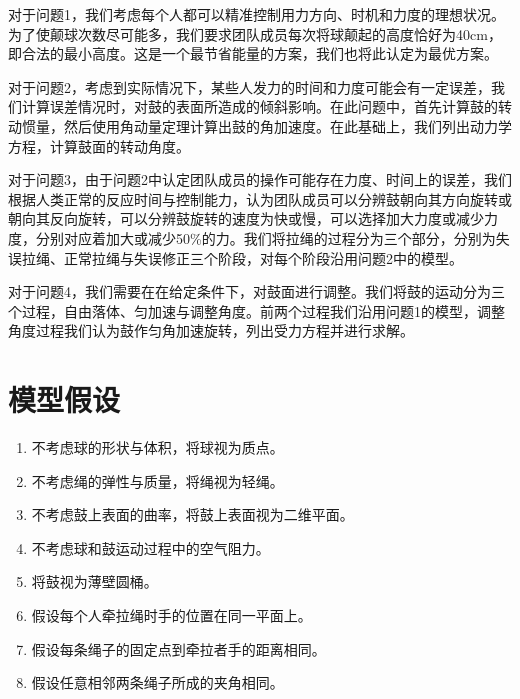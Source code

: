 \documentclass[nocover]{cumcmart}%
\begin{document}
对于问题1，我们考虑每个人都可以精准控制用力方向、时机和力度的理想状况。为了使颠球次数尽可能多，我们要求团队成员每次将球颠起的高度恰好为40cm，即合法的最小高度。这是一个最节省能量的方案，我们也将此认定为最优方案。

对于问题2，考虑到实际情况下，某些人发力的时间和力度可能会有一定误差，我们计算误差情况时，对鼓的表面所造成的倾斜影响。在此问题中，首先计算鼓的转动惯量，然后使用角动量定理计算出鼓的角加速度。在此基础上，我们列出动力学方程，计算鼓面的转动角度。

对于问题3，由于问题2中认定团队成员的操作可能存在力度、时间上的误差，我们根据人类正常的反应时间与控制能力，认为团队成员可以分辨鼓朝向其方向旋转或朝向其反向旋转，可以分辨鼓旋转的速度为快或慢，可以选择加大力度或减少力度，分别对应着加大或减少50\%的力。我们将拉绳的过程分为三个部分，分别为失误拉绳、正常拉绳与失误修正三个阶段，对每个阶段沿用问题2中的模型。

对于问题4，我们需要在在给定条件下，对鼓面进行调整。我们将鼓的运动分为三个过程，自由落体、匀加速与调整角度。前两个过程我们沿用问题1的模型，调整角度过程我们认为鼓作匀角加速旋转，列出受力方程并进行求解。

\section{模型假设}

\begin{enumerate}
    \item 不考虑球的形状与体积，将球视为质点。
    \item 不考虑绳的弹性与质量，将绳视为轻绳。
    \item 不考虑鼓上表面的曲率，将鼓上表面视为二维平面。
    \item 不考虑球和鼓运动过程中的空气阻力。
    \item 将鼓视为薄壁圆桶。
    \item 假设每个人牵拉绳时手的位置在同一平面上。
    \item 假设每条绳子的固定点到牵拉者手的距离相同。
    \item 假设任意相邻两条绳子所成的夹角相同。
\end{enumerate}
\end{document}
